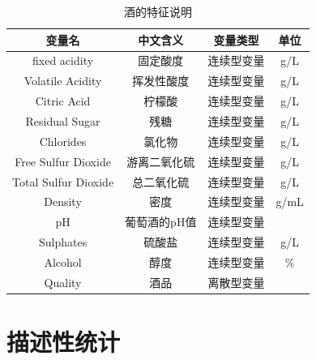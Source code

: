 \documentclass[fontset=ubuntu]{ctexart}
\begin{document}
        \begin{table}[htbp]
            \centering
            \caption{酒的特征说明}
            \vspace{5pt}
            \begin{tabular}{cccc}
                \hline
                变量名 & 中文含义 & 变量类型 & 单位 \\
                \hline
                fixed acidity & 固定酸度 & 连续型变量 & g/L \\
                Volatile Acidity & 挥发性酸度 & 连续型变量 & g/L \\
                Citric Acid & 柠檬酸 & 连续型变量 & g/L\\
                Residual Sugar & 残糖 & 连续型变量 & g/L \\
                Chlorides & 氯化物 & 连续型变量 & g/L\\
                Free Sulfur Dioxide & 游离二氧化硫 & 连续型变量 & g/L \\
                Total Sulfur Dioxide & 总二氧化硫 & 连续型变量 & g/L \\
                Density & 密度 & 连续型变量 & g/mL \\
                pH &  葡萄酒的pH值 & 连续型变量 & \\
                Sulphates & 硫酸盐 & 连续型变量 & g/L \\
                Alcohol & 醇度 & 连续型变量 & \% \\
                Quality & 酒品 & 离散型变量 & \\ 
                \hline
            \end{tabular}
            \label{tab:features}
        \end{table}

    \section{描述性统计}
\end{document}
